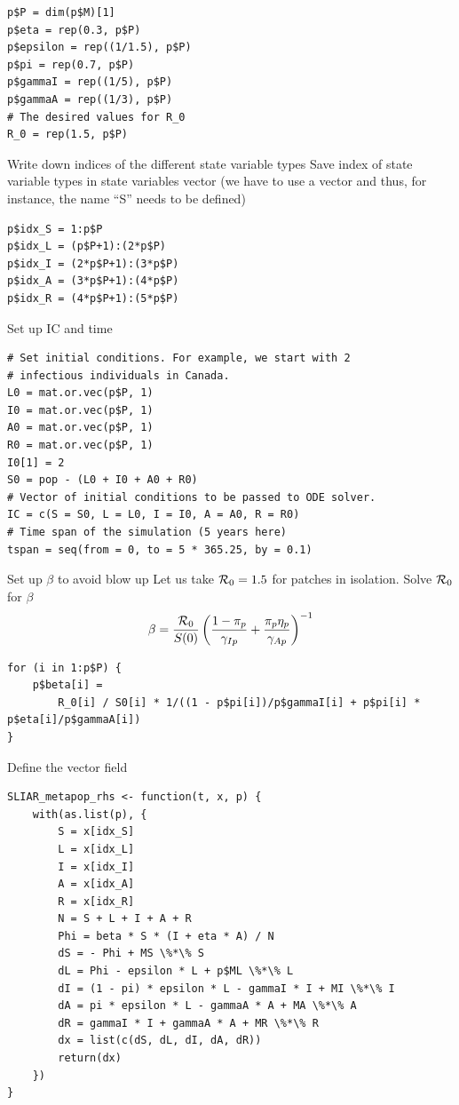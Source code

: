 \documentclass[aspectratio=169]{beamer}\usepackage[]{graphicx}\usepackage[]{xcolor}
\begin{document}
\begin{frame}[fragile]
\begin{lstlisting}
p$P = dim(p$M)[1]
p$eta = rep(0.3, p$P)
p$epsilon = rep((1/1.5), p$P)
p$pi = rep(0.7, p$P)
p$gammaI = rep((1/5), p$P)
p$gammaA = rep((1/3), p$P)
# The desired values for R_0
R_0 = rep(1.5, p$P)
\end{lstlisting}	
\end{frame}

\begin{frame}[fragile]{Write down indices of the different state variable types}
	Save index of state variable types in state variables vector (we have to use a vector and thus, for instance, the name ``S'' needs to be defined)
\begin{lstlisting}
p$idx_S = 1:p$P
p$idx_L = (p$P+1):(2*p$P)
p$idx_I = (2*p$P+1):(3*p$P)
p$idx_A = (3*p$P+1):(4*p$P)
p$idx_R = (4*p$P+1):(5*p$P)
\end{lstlisting}	
\end{frame}

\begin{frame}[fragile]{Set up IC and time}
\begin{lstlisting}
# Set initial conditions. For example, we start with 2
# infectious individuals in Canada.
L0 = mat.or.vec(p$P, 1)
I0 = mat.or.vec(p$P, 1)
A0 = mat.or.vec(p$P, 1)
R0 = mat.or.vec(p$P, 1)
I0[1] = 2
S0 = pop - (L0 + I0 + A0 + R0)
# Vector of initial conditions to be passed to ODE solver.
IC = c(S = S0, L = L0, I = I0, A = A0, R = R0)
# Time span of the simulation (5 years here)
tspan = seq(from = 0, to = 5 * 365.25, by = 0.1)
\end{lstlisting}	
\end{frame}


\begin{frame}[fragile]{Set up $\beta$ to avoid blow up}
	Let us take $\mathcal{R}_0=1.5$ for patches in isolation. Solve $\mathcal{R}_0$ for $\beta$ 
	$$
	\beta=\frac{\mathcal{R}_0}{S(0)}
	\left(
	\frac{1-\pi_p}{\gamma_{Ip}}
	+\frac{\pi_p\eta_p}{\gamma_{Ap}}
	\right)^{-1}
	$$ 
\begin{lstlisting}
for (i in 1:p$P) {
	p$beta[i] = 
		R_0[i] / S0[i] * 1/((1 - p$pi[i])/p$gammaI[i] + p$pi[i] * p$eta[i]/p$gammaA[i])
}
\end{lstlisting}	
\end{frame}

\begin{frame}[fragile]{Define the vector field}
\begin{lstlisting}[language=Renhanced]
SLIAR_metapop_rhs <- function(t, x, p) {
	with(as.list(p), {
		S = x[idx_S]
		L = x[idx_L]
		I = x[idx_I]
		A = x[idx_A]
		R = x[idx_R]
		N = S + L + I + A + R
		Phi = beta * S * (I + eta * A) / N
		dS = - Phi + MS \%*\% S
		dL = Phi - epsilon * L + p$ML \%*\% L
		dI = (1 - pi) * epsilon * L - gammaI * I + MI \%*\% I
		dA = pi * epsilon * L - gammaA * A + MA \%*\% A
		dR = gammaI * I + gammaA * A + MR \%*\% R
		dx = list(c(dS, dL, dI, dA, dR))
		return(dx)
	})
}	
\end{lstlisting}
\end{frame}
	
\end{document}
